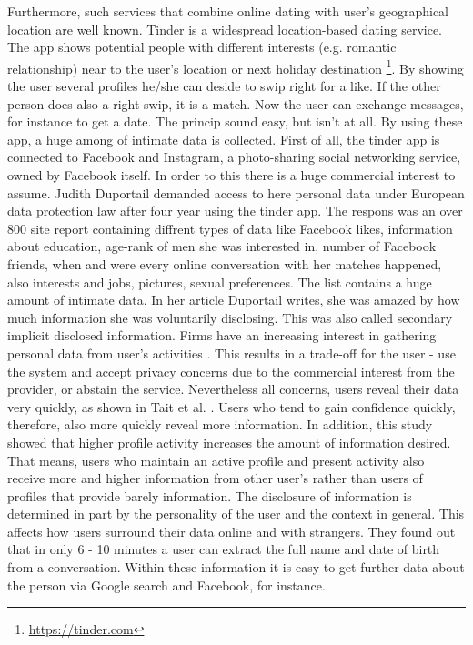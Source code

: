 Furthermore, such services that combine online dating with user's geographical location are well known. Tinder is a widespread location-based dating service. The app shows potential people with different interests (e.g. romantic relationship) near to the user's location or next holiday destination \footnote{\url{https://tinder.com}}. By showing the user several profiles he/she can deside to swip right for a like. If the other person does also a right swip, it is a match. Now the user can exchange messages, for instance to get a date. The princip sound easy, but isn't at all. By using these app, a huge among of intimate data is collected. 
First of all, the tinder app is connected to Facebook and Instagram, a photo-sharing social networking service, owned by Facebook itself. In order to this there is a huge commercial interest to assume. Judith Duportail demanded access to here personal data under European data protection law after four year using the tinder app. The respons was an over 800 site report containing diffrent types of data like Facebook likes, information about education, age-rank of men she was interested in, number of Facebook friends, when and were every online conversation with her matches happened, also interests and jobs, pictures, sexual preferences. The list contains a huge amount of intimate data. In her article Duportail writes, she was amazed by how much information she was voluntarily disclosing. This was also called secondary implicit disclosed information. Firms have an increasing interest in gathering personal data from user's activities \cite{taylor2009privacy}. This results in a trade-off for the user - use the system and accept privacy concerns due to the commercial interest from the provider, or abstain the service.
Nevertheless all concerns, users reveal their data very quickly, as shown in Tait et al. \cite{tait2015hello}. 
Users who tend to gain confidence quickly, therefore, also more quickly reveal more information. In addition, this study showed that higher profile activity increases the amount of information desired. 
That means, users who maintain an active profile and present activity also receive more and higher information from other user's rather than users of profiles that provide barely information. The disclosure of information is determined in part by the personality of the user and the context in general. This affects how users surround their data online and with strangers. They found out that in only 6 - 10 minutes a user can extract the full name and date of birth from a conversation. Within these information it is easy to get further data about the person via Google search and Facebook, for instance.

